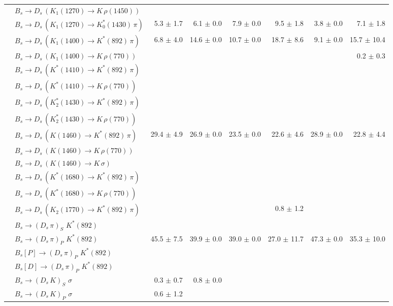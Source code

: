 \begin{tabular}{l l  r  r  r  r  r  r  }
 & $B_s \to D_s \, ( K_1(1270) \to K \, \rho(1450) )$ &  &  &  &  &  &  \\ 
 & $B_s \to D_s \, ( K_1(1270) \to K^{*}_{0}(1430) \, \pi )$ & 5.3 $\pm$ 1.7 & 6.1 $\pm$ 0.0 & 7.9 $\pm$ 0.0 & 9.5 $\pm$ 1.8 & 3.8 $\pm$ 0.0 & 7.1 $\pm$ 1.8 \\ 
 & $B_s \to D_s \, ( K_1(1400) \to K^{*}(892) \, \pi )$ & 6.8 $\pm$ 4.0 & 14.6 $\pm$ 0.0 & 10.7 $\pm$ 0.0 & 18.7 $\pm$ 8.6 & 9.1 $\pm$ 0.0 & 15.7 $\pm$ 10.4 \\ 
 & $B_s \to D_s \, ( K_1(1400) \to K \, \rho(770) )$ &  &  &  &  &  & 0.2 $\pm$ 0.3 \\ 
 & $B_s \to D_s \, ( K^{*}(1410) \to K^{*}(892) \, \pi )$ &  &  &  &  &  &  \\ 
 & $B_s \to D_s \, ( K^{*}(1410) \to K \, \rho(770) )$ &  &  &  &  &  &  \\ 
 & $B_s \to D_s \, ( K_2^{*}(1430) \to K^{*}(892) \, \pi )$ &  &  &  &  &  &  \\ 
 & $B_s \to D_s \, ( K_2^{*}(1430) \to K \, \rho(770) )$ &  &  &  &  &  &  \\ 
 & $B_s \to D_s \, ( K(1460) \to K^{*}(892) \, \pi )$ & 29.4 $\pm$ 4.9 & 26.9 $\pm$ 0.0 & 23.5 $\pm$ 0.0 & 22.6 $\pm$ 4.6 & 28.9 $\pm$ 0.0 & 22.8 $\pm$ 4.4 \\ 
 & $B_s \to D_s \, ( K(1460) \to K \, \rho(770) )$ &  &  &  &  &  &  \\ 
 & $B_s \to D_s \, ( K(1460) \to K \, \sigma )$ &  &  &  &  &  &  \\ 
 & $B_s \to D_s \, ( K^{*}(1680) \to K^{*}(892) \, \pi )$ &  &  &  &  &  &  \\ 
 & $B_s \to D_s \, ( K^{*}(1680) \to K \, \rho(770) )$ &  &  &  &  &  &  \\ 
 & $B_s \to D_s \, ( K_2(1770) \to K^{*}(892) \, \pi )$ &  &  &  & 0.8 $\pm$ 1.2 &  &  \\ 
 & $B_s \to ( D_s \, \pi)_{S} \, \, K^{*}(892)$ &  &  &  &  &  &  \\ 
 & $B_s \to ( D_s \, \pi)_{P} \, \, K^{*}(892)$ & 45.5 $\pm$ 7.5 & 39.9 $\pm$ 0.0 & 39.0 $\pm$ 0.0 & 27.0 $\pm$ 11.7 & 47.3 $\pm$ 0.0 & 35.3 $\pm$ 10.0 \\ 
 & $B_s[P] \to ( D_s \, \pi)_{P} \, \, K^{*}(892)$ &  &  &  &  &  &  \\ 
 & $B_s[D] \to ( D_s \, \pi)_{P} \, \, K^{*}(892)$ &  &  &  &  &  &  \\ 
 & $B_s \to ( D_s \, K)_{S} \, \, \sigma$ & 0.3 $\pm$ 0.7 & 0.8 $\pm$ 0.0 &  &  &  &  \\ 
 & $B_s \to ( D_s \, K)_{P} \, \, \sigma$ & 0.6 $\pm$ 1.2 &  &  &  &  &  \\ 

\end{tabular}
